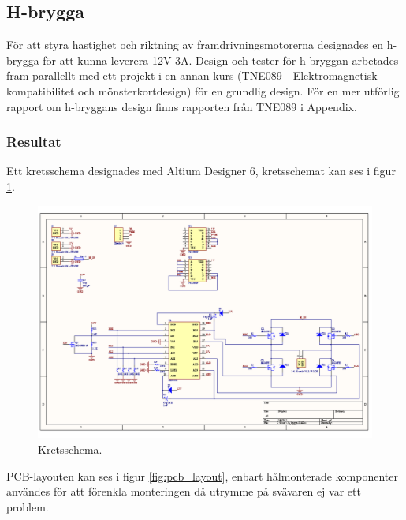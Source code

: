 \subsection{H-brygga}
För att styra hastighet och riktning av framdrivningsmotorerna designades en h-brygga för att kunna leverera 12V 3A. Design och tester för h-bryggan arbetades fram parallellt med ett projekt i en annan kurs (TNE089 - Elektromagnetisk kompatibilitet och mönsterkortdesign) för en grundlig design. För en mer utförlig rapport om h-bryggans design finns rapporten från TNE089 i Appendix.

\subsubsection{Resultat}
Ett kretsschema designades med Altium Designer 6, kretsschemat kan ses i figur \ref{fig:h_brygga_schema}.

\begin{landscape}
\begin{figure}[htbp!]
\centering
\includegraphics[width=20cm]{../../includes/figures/h_brygga_schematic}
\caption{Kretsschema.}
\label{fig:h_brygga_schema}
\end{figure}
\end{landscape}

PCB-layouten kan ses i figur \ref{fig:pcb_layout}, enbart hålmonterade komponenter användes för att förenkla monteringen då utrymme på svävaren ej var ett problem.


